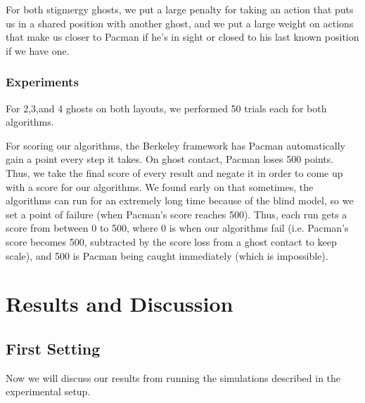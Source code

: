 \documentclass[11pt]{article}
\begin{document}
\begin{multicols}{2}
For both stigmergy ghosts, we put a large penalty for taking an action that puts us in a shared position with another ghost, and we put a large weight on actions that make us closer to Pacman if he's in sight or closed to his last known position if we have one.

\subsubsection{Experiments}

For 2,3,and 4 ghosts on both layouts, we performed 50 trials each for both algorithms.  

For scoring our algorithms, the Berkeley framework has Pacman automatically gain a point every step it takes.  On ghost contact, Pacman loses 500 points.  Thus, we take the final score of every result and negate it in order to come up with a score for our algorithms.  We found early on that sometimes, the algorithms can run for an extremely long time because of the blind model, so we set a point of failure (when Pacman's score reaches 500).  Thus, each run gets a score from between 0 to 500, where 0 is when our algorithms fail (i.e. Pacman's score becomes 500, subtracted by the score loss from a ghost contact to keep scale), and 500 is Pacman being caught immediately (which is impossible).

\section{Results and Discussion}

\subsection{First Setting}
Now we will discuss our results from running the simulations described in the experimental setup. 


\end{multicols}
\end{document}

